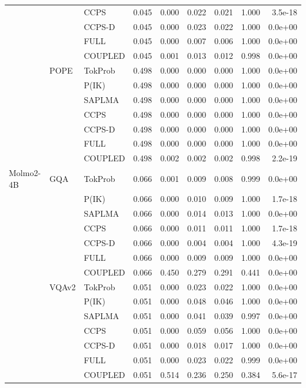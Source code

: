 \begin{longtable}{
>{\small}l
>{\small}l
>{\small}l
>{\small}r
>{\small}r
>{\small}r
>{\small}r
>{\small}r
>{\small}r
}
 &  & CCPS & 0.045 & 0.000 & 0.022 & 0.021 & 1.000 & 3.5e-18 \\
 &  & CCPS-D & 0.045 & 0.000 & 0.023 & 0.022 & 1.000 & 0.0e+00 \\
 &  & FULL & 0.045 & 0.000 & 0.007 & 0.006 & 1.000 & 0.0e+00 \\
 &  & COUPLED & 0.045 & 0.001 & 0.013 & 0.012 & 0.998 & 0.0e+00 \\
\addlinespace
 & POPE & TokProb & 0.498 & 0.000 & 0.000 & 0.000 & 1.000 & 0.0e+00 \\
 &  & P(IK) & 0.498 & 0.000 & 0.000 & 0.000 & 1.000 & 0.0e+00 \\
 &  & SAPLMA & 0.498 & 0.000 & 0.000 & 0.000 & 1.000 & 0.0e+00 \\
 &  & CCPS & 0.498 & 0.000 & 0.000 & 0.000 & 1.000 & 0.0e+00 \\
 &  & CCPS-D & 0.498 & 0.000 & 0.000 & 0.000 & 1.000 & 0.0e+00 \\
 &  & FULL & 0.498 & 0.000 & 0.000 & 0.000 & 1.000 & 0.0e+00 \\
 &  & COUPLED & 0.498 & 0.002 & 0.002 & 0.002 & 0.998 & 2.2e-19 \\
\midrule
Molmo2-4B & GQA & TokProb & 0.066 & 0.001 & 0.009 & 0.008 & 0.999 & 0.0e+00 \\
 &  & P(IK) & 0.066 & 0.000 & 0.010 & 0.009 & 1.000 & 1.7e-18 \\
 &  & SAPLMA & 0.066 & 0.000 & 0.014 & 0.013 & 1.000 & 0.0e+00 \\
 &  & CCPS & 0.066 & 0.000 & 0.011 & 0.011 & 1.000 & 1.7e-18 \\
 &  & CCPS-D & 0.066 & 0.000 & 0.004 & 0.004 & 1.000 & 4.3e-19 \\
 &  & FULL & 0.066 & 0.000 & 0.009 & 0.009 & 1.000 & 0.0e+00 \\
 &  & COUPLED & 0.066 & 0.450 & 0.279 & 0.291 & 0.441 & 0.0e+00 \\
\addlinespace
 & VQAv2 & TokProb & 0.051 & 0.000 & 0.023 & 0.022 & 1.000 & 0.0e+00 \\
 &  & P(IK) & 0.051 & 0.000 & 0.048 & 0.046 & 1.000 & 0.0e+00 \\
 &  & SAPLMA & 0.051 & 0.000 & 0.041 & 0.039 & 0.997 & 0.0e+00 \\
 &  & CCPS & 0.051 & 0.000 & 0.059 & 0.056 & 1.000 & 0.0e+00 \\
 &  & CCPS-D & 0.051 & 0.000 & 0.018 & 0.017 & 1.000 & 0.0e+00 \\
 &  & FULL & 0.051 & 0.000 & 0.023 & 0.022 & 0.999 & 0.0e+00 \\
 &  & COUPLED & 0.051 & 0.514 & 0.236 & 0.250 & 0.384 & 5.6e-17 \\

\end{longtable}
